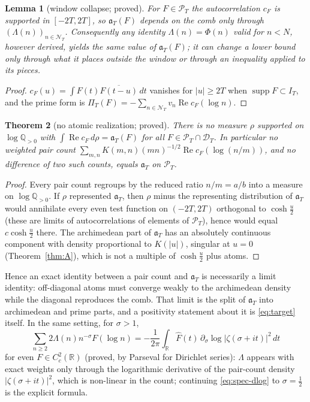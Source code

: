 \documentclass[11pt]{amsart}
\newtheorem{theorem}{Theorem}[section]
\newtheorem{lemma}[theorem]{Lemma}
\theoremstyle{definition}
\theoremstyle{remark}
\newcommand{\R}{\mathbb R}
\newcommand{\Q}{\mathbb Q}
\newcommand{\Rel}{\operatorname{Re}}
\newcommand{\supp}{\operatorname{supp}}
\newcommand{\PT}{\mathcal P_T}
\newcommand{\IT}{I_T}
\newcommand{\Fh}{\widehat F}
\newcommand{\cF}{c_F}
\newcommand{\NT}{\mathcal N_T}
\newcommand{\PiT}{\Pi_T}
\begin{document}
\begin{lemma}[window collapse; proved]\label{lem:spec-collapse}
For $F\in\PT$ the autocorrelation $\cF$ is supported in $[-2T,2T]$, so $\mathfrak a_T(F)$ depends on the comb only through
$(\Lambda(n))_{n\in\NT}$. Consequently any identity $\Lambda(n)=\Phi(n)$ valid for $n<N$, however derived, yields the same value of
$\mathfrak a_T(F)$; it can change a lower bound only through what it places outside the window or through an inequality applied to its
pieces.
\end{lemma}
\begin{proof}
$\cF(u)=\int F(t)\overline{F(t-u)}\,dt$ vanishes for $|u|\ge2T$ when $\supp F\subset\IT$, and the prime form is
$\PiT(F)=-\sum_{n\in\NT}v_n\Rel\cF(\log n)$.
\end{proof}

\begin{theorem}[no atomic realization; proved]\label{thm:spec-noatom}
There is no measure $\rho$ supported on $\log\Q_{>0}$ with $\int\Rel\cF\,d\rho=\mathfrak a_T(F)$ for all $F\in\PT\cap\mathcal D_T$. In
particular no weighted pair count $\sum_{m,n}K(m,n)(mn)^{-1/2}\Rel\cF(\log(n/m))$, and no difference of two such counts, equals
$\mathfrak a_T$ on $\PT$.
\end{theorem}
\begin{proof}
Every pair count regroups by the reduced ratio $n/m=a/b$ into a measure on $\log\Q_{>0}$. If $\rho$ represented $\mathfrak a_T$, then
$\rho$ minus the representing distribution of $\mathfrak a_T$ would annihilate every even test function on $(-2T,2T)$ orthogonal to
$\cosh\frac u2$ (these are limits of autocorrelations of elements of $\PT$), hence would equal $c\cosh\frac u2$ there. The archimedean
part of $\mathfrak a_T$ has an absolutely continuous component with density proportional to $K(|u|)$, singular at $u=0$ (Theorem~\ref{thm:A}),
which is not a multiple of $\cosh\frac u2$ plus atoms.
\end{proof}

Hence an exact identity between a pair count and $\mathfrak a_T$ is necessarily a limit identity: off-diagonal atoms must converge
weakly to the archimedean density while the diagonal reproduces the comb. That limit is the split of $\mathfrak a_T$ into archimedean
and prime parts, and a positivity statement about it is \eqref{eq:target} itself. In the same setting, for $\sigma>1$,
\begin{equation}\label{eq:spec-dlog}
\sum_{n\ge2}2\Lambda(n)n^{-\sigma}F(\log n)=-\frac1{2\pi}\int_\R\Fh(t)\,\partial_\sigma\log|\zeta(\sigma+it)|^2\,dt
\end{equation}
for even $F\in C^2_c(\R)$ (proved, by Parseval for Dirichlet series): $\Lambda$ appears with exact weights only through the logarithmic
derivative of the pair-count density $|\zeta(\sigma+it)|^2$, which is non-linear in the count; continuing \eqref{eq:spec-dlog} to
$\sigma=\frac12$ is the explicit formula.
\end{document}

